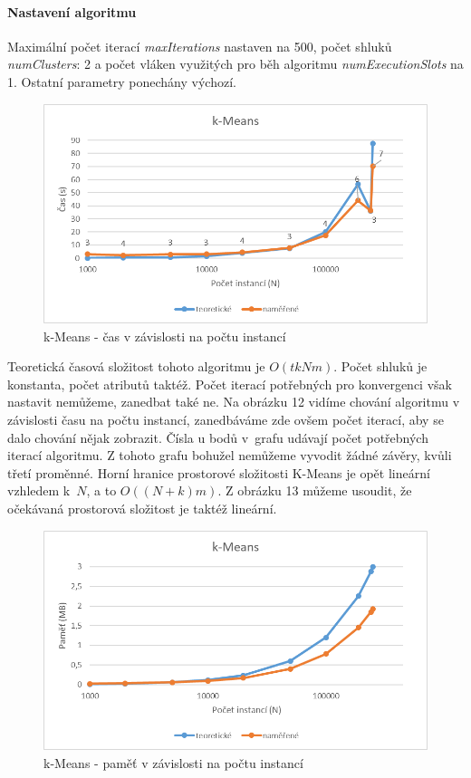 \documentclass[12pt]{article}
\begin{document}
\paragraph{Nastavení algoritmu}
Maximální počet iterací \textit{maxIterations} nastaven na 500, počet shluků \textit{numClusters}: 2 a počet vláken využitých pro běh algoritmu \textit{numExecutionSlots} na 1. Ostatní parametry ponechány výchozí.
\begin{figure}[hbp]
  \centering
  \includegraphics[scale=1]{img/kmeans.png}
  \caption{k-Means - čas v závislosti na počtu instancí}
\end{figure}
Teoretická časová složitost tohoto algoritmu je $O(tkNm)$. Počet shluků je konstanta, počet atributů taktéž. Počet iterací potřebných pro konvergenci však nastavit nemůžeme, zanedbat také ne. Na obrázku 12 vidíme chování algoritmu v závislosti času na počtu instancí, zanedbáváme zde ovšem počet iterací, aby se dalo chování nějak zobrazit. Čísla u bodů v~grafu udávají počet potřebných iterací algoritmu. Z tohoto grafu bohužel nemůžeme vyvodit žádné závěry, kvůli třetí proměnné.
Horní hranice prostorové složitosti K-Means je opět lineární vzhledem k~$N$, a to $O((N+k)m)$. Z obrázku 13 můžeme usoudit, že očekávaná prostorová složitost je taktéž lineární. 
\begin{figure}[h]
  \centering
  \includegraphics[scale=1]{img/kmeansp.png}
  \caption{k-Means - paměť v závislosti na počtu instancí}
\end{figure}
\end{document}
